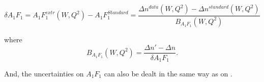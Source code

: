 \begin{equation}
\label{a1f1Ext}
\delta A_{1}F_{1} = A_{1}F_{1}^{extr}(W,Q^2) - A_{1}F_{1}^{Standard} = \frac{\Delta n^{data}(W,Q^2) - \Delta n^{standard}(W,Q^2)}{B_{A_1F_1}(W,Q^2) }
\end{equation}

where
\begin{equation}
\label{propFac}
B_{A_1F_1}(W,Q^2)  = \frac{\Delta n' - \Delta n}{\delta A_1F_1}.
\end{equation}

And, the uncertainties on $A_1F_1$ can also be dealt in the same way as on \gone.












